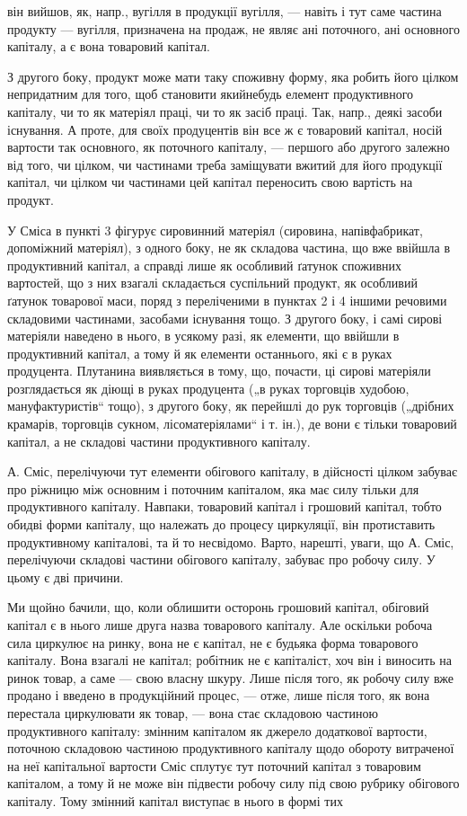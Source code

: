 \parcont{}  %
він вийшов, як, напр., вугілля в продукції вугілля, — навіть і тут саме
частина продукту — вугілля, призначена на продаж, не являє ані поточного,
ані основного капіталу, а є вона товаровий капітал.

З другого боку, продукт може мати таку споживну форму, яка робить
його цілком непридатним для того, щоб становити якийнебудь елемент
продуктивного капіталу, чи то як матеріял праці, чи то як засіб
праці. Так, напр., деякі засоби існування. А проте, для своїх продуцентів
він все ж є товаровий капітал, носій вартости так основного, як поточного
капіталу, — першого або другого залежно від того, чи цілком,
чи частинами треба заміщувати вжитий для його продукції капітал, чи
цілком чи частинами цей капітал переносить свою вартість на продукт.

У Сміса в пункті 3 фігурує сировинний матеріял (сировина, напівфабрикат,
допоміжний матеріял), з одного боку, не як складова частина,
що вже ввійшла в продуктивний капітал, а справді лише як особливий ґатунок
споживних вартостей, що з них взагалі складається суспільний
продукт, як особливий ґатунок товарової маси, поряд з переліченими в
пунктах 2 і 4 іншими речовими складовими частинами, засобами існування
тощо. З другого боку, і самі сирові матеріяли наведено в нього, в
усякому разі, як елементи, що ввійшли в продуктивний капітал, а тому й
як елементи останнього, які є в руках продуцента. Плутанина виявляється в
тому, що, почасти, ці сирові матеріяли розглядається як діющі в руках
продуцента („в руках торговців худобою, мануфактуристів“ тощо), з
другого боку, як перейшлі до рук торговців („дрібних крамарів, торговців
сукном, лісоматеріялами“ і т. ін.), де вони є тільки товаровий капітал, а
не складові частини продуктивного капіталу.

А. Сміс, перелічуючи тут елементи обігового капіталу, в дійсності цілком
забуває про ріжницю між основним і поточним капіталом, яка має
силу тільки для продуктивного капіталу. Навпаки, товаровий капітал і
грошовий капітал, тобто обидві форми капіталу, що належать до процесу
циркуляції, він протиставить продуктивному капіталові, та й то несвідомо.
Варто, нарешті, уваги, що А. Сміс, перелічуючи складові частини обігового
капіталу, забуває про робочу силу. У цьому є дві причини.

Ми щойно бачили, що, коли облишити осторонь грошовий капітал,
обіговий капітал є в нього лише друга назва товарового капіталу. Але
оскільки робоча сила циркулює на ринку, вона не є капітал, не є будьяка
форма товарового капіталу. Вона взагалі не капітал; робітник не є
капіталіст, хоч він і виносить на ринок товар, а саме — свою власну шкуру.
Лише після того, як робочу силу вже продано і введено в продукційний
процес, — отже, лише після того, як вона перестала циркулювати
як товар, — вона стає складовою частиною продуктивного капіталу: змінним
капіталом як джерело додаткової вартости, поточною складовою
частиною продуктивного капіталу щодо обороту витраченої на неї капітальної
вартости Сміс сплутує тут поточний капітал з товаровим капіталом,
а тому й не може він підвести робочу силу під свою рубрику обігового
капіталу. Тому змінний капітал виступає в нього в формі тих
\parbreak{}  %
